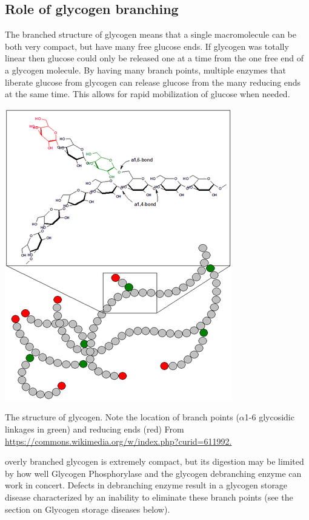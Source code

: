\documentclass{tufte-handout}
\begin{document}
\subsection{Role of glycogen branching}

The branched structure of glycogen means that a single macromolecule can be both very compact, but have many free glucose ends.  If glycogen was totally linear then glucose could only be released one at a time from the one free end of a glycogen molecule.  By having many branch points, multiple enzymes that liberate glucose from glycogen can release glucose from the many reducing ends at the same time.  This allows for rapid mobilization of glucose when needed.  

\begin{marginfigure}
\includegraphics{figures/Glycogen.png}
\caption{The structure of glycogen.  Note the location of branch points ($\alpha$1-6 glycosidic linkages in green) and reducing ends (red) From \url{https://commons.wikimedia.org/w/index.php?curid=611992.}}
\label{fig:glycogen-structure}
\end{marginfigure}

 overly branched glycogen is extremely compact, but its digestion may be limited by how well Glycogen Phosphorylase and the glycogen debranching enzyme can work in concert.  Defects in debranching enzyme result in a glycogen storage disease characterized by an inability to eliminate these branch points (see the section on Glycogen storage diseases below).
\end{document}
